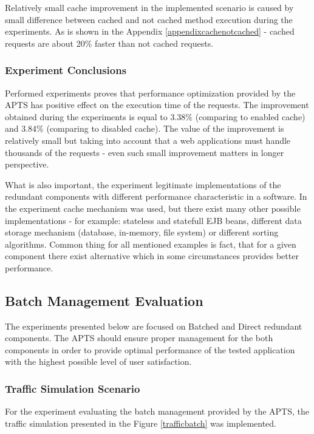 \documentclass[12pt,a4paper]{article}
\begin{document}
Relatively small cache improvement in the implemented scenario is caused by small difference between cached and not cached method execution during the experiments. As is shown in the Appendix \ref{appendixcachenotcached} - cached requests are about 20\% faster than not cached requests. 

\subsubsection{Experiment Conclusions} 


Performed experiments proves that performance optimization provided by the APTS has positive effect on the execution time of the requests. The improvement obtained during the experiments is equal to 3.38\% (comparing to enabled cache) and 3.84\% (comparing to disabled cache). The value of the improvement is relatively small but taking into account that a web applications must handle thousands of the requests - even such small improvement matters in longer perspective.  

What is also important, the experiment legitimate implementations of the redundant components with different performance characteristic in a software. In the experiment cache mechanism was used, but there exist many other possible implementations - for example: stateless and statefull EJB beans, different data storage mechanism (database, in-memory, file system) or different sorting algorithms. Common thing for all mentioned examples is fact, that for a given component there exist alternative which in some circumstances provides better performance.     

 

\subsection{Batch Management Evaluation}

The experiments presented below are focused on Batched and Direct redundant components. The APTS should ensure proper management for the both components in order to provide optimal performance of the tested application with the highest possible level of user satisfaction.  

\subsubsection{Traffic Simulation Scenario} \label{batchsimulationscenario}

For the experiment evaluating the batch management provided by the APTS, the traffic simulation presented in the Figure \ref{trafficbatch} was implemented.
\end{document}
